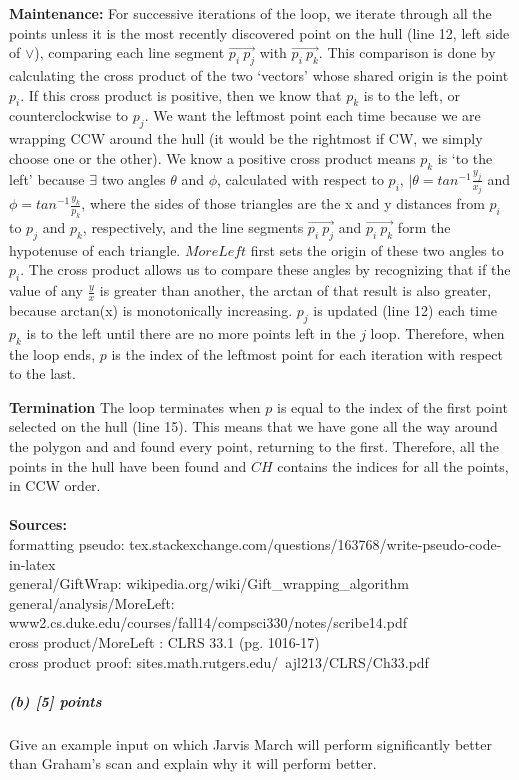 \documentclass[11pt]{article}
\begin{document}
\textbf{Maintenance:} For successive iterations of the loop, we iterate through all the points unless it is the most recently discovered point on the hull (line 12, left side of $\lor$), comparing each line segment $\overrightarrow{{p_i\> }p_{j}}$ with $\overrightarrow{{p_i\>}{p_k}}$. This comparison is done by calculating the cross product of the two `vectors' whose shared origin is the point $p_i$. If this cross product is positive, then we know that $p_k$ is to the left, or counterclockwise to $p_{j}$. We want the leftmost point each time because we are wrapping CCW around the hull (it would be the rightmost if CW, we simply choose one or the other). We know a positive cross product means $p_k$ is `to the left' because $\exists$ two angles $\theta$ and $\phi$, calculated with respect to $p_i$, $ \mid \theta = tan^{-1} \frac{y_{j}}{x_{j}}$ and $\phi = tan^{-1} \frac{y_k}{p_k}$, where the sides of those triangles are the x and y distances from $p_i$ to $p_j$ and $p_k$, respectively, and the line segments $\overrightarrow{{p_i\> }p_{j}}$ and $\overrightarrow{{p_i\>}{p_k}}$ form the hypotenuse of each triangle. $MoreLeft$ first sets the origin of these two angles to $p_i$. The cross product allows us to compare these angles by recognizing that if the value of any $\frac{y}{x}$ is greater than another, the arctan of that result is also greater, because arctan(x) is monotonically increasing. $p_{j}$ is updated (line 12) each time $p_k$ is to the left until there are no more points left in the $j$ loop. Therefore, when the loop ends, $p$ is the index of the leftmost point for each iteration with respect to the last.

\textbf{Termination} The loop terminates when $p$ is equal to the index of the first point selected on the hull (line 15). This means that we have gone all the way around the polygon and and found every point, returning to the first. Therefore, all the points in the hull have been found and $CH$ contains the indices for all the points, in CCW order.\\\\   
\noindent \textbf{Sources:}\\ 
\noindent formatting pseudo: tex.stackexchange.com/questions/163768/write-pseudo-code-in-latex\\
general/GiftWrap: wikipedia.org/wiki/Gift\_wrapping\_algorithm\\
general/analysis/MoreLeft: www2.cs.duke.edu/courses/fall14/compsci330/notes/scribe14.pdf\\
cross product/MoreLeft : CLRS 33.1 (pg. 1016-17)\\
cross product proof: sites.math.rutgers.edu/~ajl213/CLRS/Ch33.pdf
\subparagraph{(b) [5] points}
Give an example input on which Jarvis March will perform significantly better than Graham's scan and explain why it will perform better.\\
\end{document}
